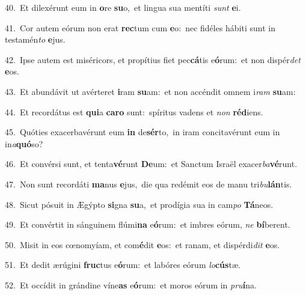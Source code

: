 {\numbfont\textcolor{\numbcolor}{40.}}~Et dilexérunt eum in \textbf{o}\-re \textbf{su}\-o,~\star et lingua sua mentíti \textit{sunt} \textbf{e}\-i.\par
{\numbfont\textcolor{\numbcolor}{41.}}~Cor autem eórum non erat \textbf{rec}\-tum cum \textbf{e}\-o:~\star nec fidéles hábiti sunt in testamén\textit{to} \textbf{e}\-jus.\par
{\numbfont\textcolor{\numbcolor}{42.}}~Ipse autem est miséricors, et propítius fiet pec\-\textbf{cá}\-tis e\-\textbf{ó}\-rum:~\star et non dispér\textit{det} \textbf{e}\-os.\par
{\numbfont\textcolor{\numbcolor}{43.}}~Et abundávit ut avérteret \textbf{i}\-ram \textbf{su}\-am:~\star et non accéndit omnem i\textit{ram} \textbf{su}\-am:\par
{\numbfont\textcolor{\numbcolor}{44.}}~Et recordátus est \textbf{qui}\-a \textbf{ca}\-\textbf{ro} sunt:~\star spíritus vadens et \textit{non} \textbf{réd}\-iens.\par
{\numbfont\textcolor{\numbcolor}{45.}}~Quóties exacerbavérunt eum \textbf{in} de\-\textbf{sér}\-to,~\star in iram concitavérunt eum in in\-\textit{a}\-\textbf{quó}so?\par
{\numbfont\textcolor{\numbcolor}{46.}}~Et convérsi sunt, et tenta\-\textbf{vé}\-runt \textbf{De}\-um:~\star et Sanctum Israël exacer\-\textit{ba}\-\textbf{vé}runt.\par
{\numbfont\textcolor{\numbcolor}{47.}}~Non sunt recordáti \textbf{ma}\-nus \textbf{e}\-jus,~\star die qua redémit eos de manu tri\-\textit{bu}\-\textbf{lán}tis.\par
{\numbfont\textcolor{\numbcolor}{48.}}~Sicut pósuit in Ægýpto \textbf{si}\-gna \textbf{su}\-a,~\star et prodígia sua in cam\textit{po} \textbf{Tá}\-neos.\par
{\numbfont\textcolor{\numbcolor}{49.}}~Et convértit in sánguinem flúmi\textbf{na} e\-\textbf{ó}\-rum:~\star et imbres eórum, \textit{ne} \textbf{bí}\-berent.\par
{\numbfont\textcolor{\numbcolor}{50.}}~Misit in eos cœnomyíam, et com\-\textbf{é}\-dit \textbf{e}\-os:~\star et ranam, et dispérdi\textit{dit} \textbf{e}\-os.\par
{\numbfont\textcolor{\numbcolor}{51.}}~Et dedit ærúgini \textbf{fruc}\-tus e\-\textbf{ó}\-rum:~\star et labóres eórum \textit{lo}\-\textbf{cús}tæ.\par
{\numbfont\textcolor{\numbcolor}{52.}}~Et occídit in grándine víne\textbf{as} e\-\textbf{ó}\-rum:~\star et moros eórum in \textit{pru}\-\textbf{í}na.\par
